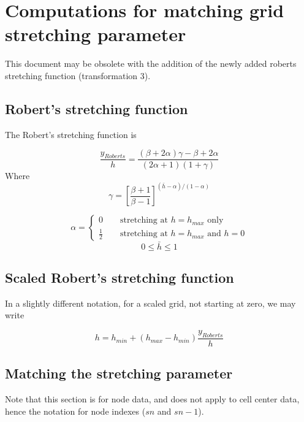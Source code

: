 \documentclass[11pt]{article}
\begin{document}
\doublespacing
\MOONSTITLE
\maketitle

\section{Computations for matching grid stretching parameter}

This document may be obsolete with the addition of the newly added roberts stretching function (transformation 3).

\subsection{Robert's stretching function}
The Robert's stretching function is

\begin{equation}
	\frac{y_{Roberts}}{h} = \frac{(\beta+2\alpha)\gamma - \beta + 2\alpha}{(2\alpha+1)(1+\gamma)}
\end{equation}
Where
\begin{equation}
	\gamma = \left[
	\frac{\beta+1}{\beta-1}
	\right]^{(\bar{h}-\alpha)/(1-\alpha)}
\end{equation}

\begin{equation}
	\alpha =
	\begin{cases}
	0 \qquad \text{stretching at $h=h_{max}$ only}
	\\
	\frac{1}{2} \qquad \text{stretching at $h=h_{max}$ and $h=0$}
	\end{cases}
\end{equation}
\begin{equation}
	0 \le \bar{h} \le 1
\end{equation}


\subsection{Scaled Robert's stretching function}
In a slightly different notation, for a scaled grid, not starting at zero, we may write

\begin{equation}
	h = h_{min} + (h_{max}-h_{min}) \frac{y_{Roberts}}{h}
\end{equation}

\subsection{Matching the stretching parameter}
Note that this section is for node data, and does not apply to cell center data, hence the notation for node indexes ($sn$ and $sn-1$).
\end{document}
